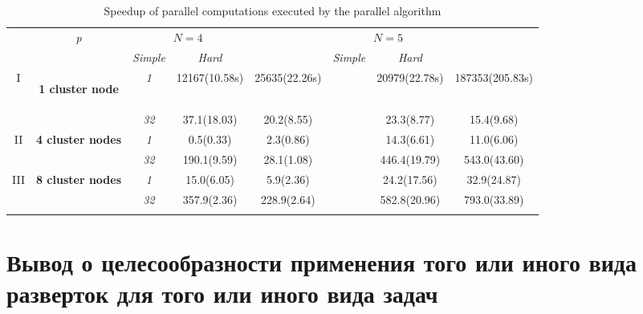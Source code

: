 \documentclass[runningheads]{llncs}
\begin{document}
\begin{table}
  \centering
  \caption{Speedup of parallel computations executed by the parallel algorithm}
  \label{tab:speedup}
  \begin{tabular}{cccccccc}
    \cline{3-8}\noalign{\smallskip}
    \multicolumn{2}{c}{  } & \textit{p} & \multicolumn{2}{c}{$N=4$} & & \multicolumn{2}{c}{$N=5$}   \\
    \noalign{\smallskip} \cline{4-5} \cline{7-8}  \noalign{\smallskip}
    \multicolumn{2}{c}{  } & & \textit{Simple} & \textit{Hard} & & \textit{Simple} & \textit{Hard}  \\
    \noalign{\smallskip}\hline
    I &
    \parbox{0.25\textwidth}{
    \begin{center}
    \textbf{1 cluster node}
    \end{center}		}
    & \textit{1}   & 12167(10.58s) & 25635(22.26s) & & 20979(22.78s) & 187353(205.83s)  \\
  &  & \textit{32} & 37.1(18.03) & 20.2(8.55)  & &  23.3(8.77) & 15.4(9.68) \\
  \hline \noalign{\smallskip}
II  & \textbf{4 cluster nodes}  %
& \textit{1} &        0.5(0.33) & 2.3(0.86)  & & 14.3(6.61) & 11.0(6.06) \\
&   & \textit{32} & 190.1(9.59) & 28.1(1.08) & & 446.4(19.79) & 543.0(43.60) \\
  \noalign{\smallskip}\hline	\noalign{\smallskip}
III & \textbf{8 cluster nodes} %
& \textit{1}    & 15.0(6.05)  & 5.9(2.36)   & & 24.2(17.56)  & 32.9(24.87)  \\
& & \textit{32} & 357.9(2.36) & 228.9(2.64) & & 582.8(20.96) & 793.0(33.89) \\
    \noalign{\smallskip}\hline
  \end{tabular}
\end{table}

\section{Вывод о целесообразности применения того или иного вида разверток для того или иного вида задач}
\end{document}
